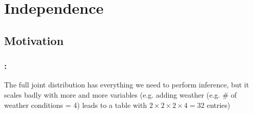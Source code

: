 \section{Independence}



\subsection{Motivation}

\begin{frame}\frametitle{\secname:~\subsecname}

The full joint distribution has everything we need to perform inference,
but it scales badly with more and more variables (e.g. adding weather (e.g. \# of weather conditions = 4) leads to a table with $2\times2\times2\times4=32$ entries)



\end{frame}


